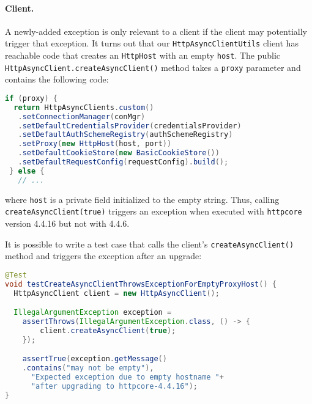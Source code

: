\paragraph{Client.} A newly-added exception is only relevant to a client if the client may potentially
trigger that exception. It turns out that our \texttt{HttpAsyncClientUtils} client has reachable code
that creates an \texttt{HttpHost} with an empty \texttt{host}. The
public \texttt{HttpAsyncClient.createAsyncClient()} method
takes a \texttt{proxy} parameter and contains the following code:
\begin{lstlisting}[language=Java,basicstyle=\scriptsize\ttfamily]
 if (proxy) {
  return HttpAsyncClients.custom()
   .setConnectionManager(conMgr)
   .setDefaultCredentialsProvider(credentialsProvider)
   .setDefaultAuthSchemeRegistry(authSchemeRegistry)
   .setProxy(new HttpHost(host, port))
   .setDefaultCookieStore(new BasicCookieStore())
   .setDefaultRequestConfig(requestConfig).build();
 } else {
   // ...
\end{lstlisting}
where \texttt{host} is a private field initialized to the empty string.
Thus, calling \texttt{createAsyncClient(true)} triggers an exception when executed with
\texttt{httpcore} version 4.4.16 but not with 4.4.6.


It is possible to write a test case that calls the client's \texttt{createAsyncClient()} method
and triggers the exception after an upgrade:
\begin{lstlisting}[language=Java,basicstyle=\scriptsize\ttfamily]
@Test
void testCreateAsyncClientThrowsExceptionForEmptyProxyHost() {
  HttpAsyncClient client = new HttpAsyncClient();

  IllegalArgumentException exception =
    assertThrows(IllegalArgumentException.class, () -> {
        client.createAsyncClient(true);
    });

    assertTrue(exception.getMessage()
    .contains("may not be empty"),
      "Expected exception due to empty hostname "+
      "after upgrading to httpcore-4.4.16");
}
\end{lstlisting}




